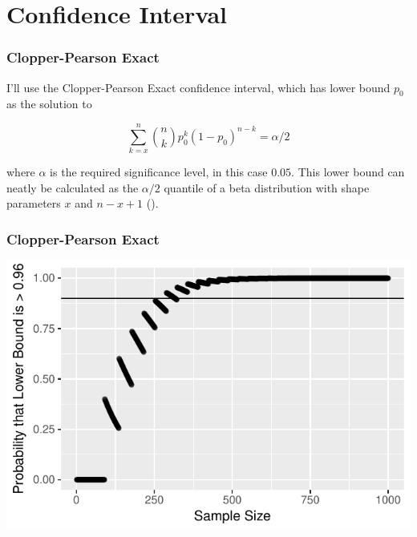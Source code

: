 \documentclass{beamer}\usepackage{knitr}
\begin{document}
\section{Confidence Interval}

\begin{frame}
\frametitle{Clopper-Pearson Exact}

I'll use the Clopper-Pearson Exact confidence interval, which has lower bound $p_0$ as the solution to

\begin{equation*}
\sum_{k = x}^{n}{\binom{n}{k}p_0^k(1-p_0)^{n-k}} = \alpha / 2
\end{equation*}

where $\alpha$ is the required significance level, in this case $0.05$. This lower bound can neatly be calculated as the $\alpha/2$ quantile of a beta distribution with shape parameters $x$ and $n - x + 1$ (\cite{Agresti1998}).
\end{frame}

\begin{frame}
\frametitle{Clopper-Pearson Exact}
\begin{knitrout}
\color{fgcolor}

{\centering \includegraphics[width=\linewidth]{figure/plot_Exact_1-1} 

}



\end{knitrout}
\end{frame}
\end{document}
